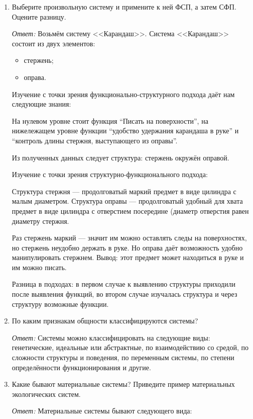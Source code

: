 \documentclass[10pt]{article}
\begin{document}
\begin{enumerate}
\item{Выберите произвольную систему и примените к ней ФСП, а затем СФП. Оцените разницу.}

  \emph{Ответ:} Возьмём систему <<Карандаш>>. Система <<Карандаш>> состоит из двух элементов:

  \begin{itemize}
  \item{стержень;}
  \item{оправа.}
  \end{itemize}

  Изучение с точки зрения функционально-структурного подхода даёт нам следующие знания:

  На нулевом уровне стоит функция ``Писать на поверхности'', на нижележащем уровне функции ``удобство удержания карандаша в руке'' и ``контроль длины стержня, выступающего из оправы''.

  Из полученных данных следует структура: стержень окружён оправой.

  Изучение с точки зрения структурно-функционального подхода:

  Структура стержня --- продолговатый маркий предмет в виде цилиндра с малым диаметром. Структура оправы --- продолговатый удобный для хвата предмет в виде цилиндра с отверстием посередине (диаметр отверстия равен диаметру стержня.

  Раз стержень маркий --- значит им можно оставлять следы на поверхностях, но стержень неудобно держать в руке. Но оправа даёт возможность удобно манипулировать стержнем. Вывод: этот предмет может находиться в руке и им можно писать.

  Разница в подходах: в первом случае к выявлению структуры приходили после выявления функций, во втором случае изучалась структура и через структуру возможные функции.

\item{По каким признакам общности классифицируются системы?}

  \emph{Ответ:} Системы можно классифицировать на следующие виды: генетические, идеальные или абстрактные, по взаимодействию со средой, по сложности структуры и поведения, по переменным системы, по степени определённости функционирования и другие.

\item{Какие бывают материальные системы? Приведите пример материальных экологических систем.}

  \emph{Ответ:} Материальные системы бывают следующего вида:


\end{enumerate}
\end{document}
